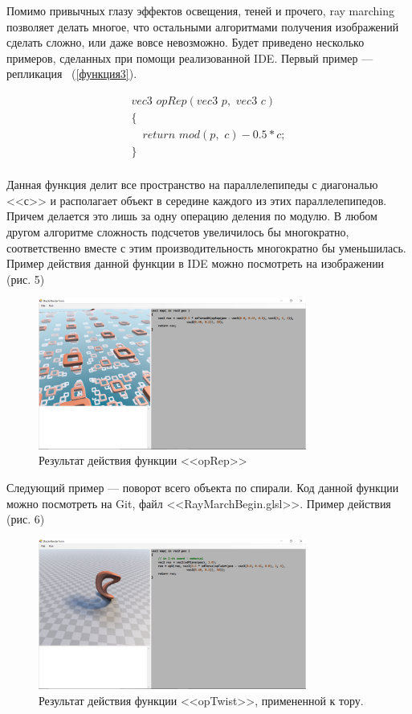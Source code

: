 \documentclass[14pt]{matmex-diploma}
\begin{document}
Помимо привычных глазу эффектов освещения, теней и прочего, ray marching позволяет делать многое, что остальными алгоритмами получения
изображений сделать сложно, или даже вовсе невозможно. Будет приведено несколько примеров, сделанных при помощи реализованной IDE.
Первый пример --- репликация ~(\ref{функция3}).

\begin{equation}
\label{функция3}
\begin{array}{ll}
vec3\,\,opRep(vec3\,\,p,\,\,vec3\,\,c)         \\
\{                                             \\
\,\,\,\,\,\,return\,\,mod(p,\,\,c) - 0.5 * c;  \\
\}                                             \\
\end{array}
\end{equation}

Данная функция делит все пространство на параллелепипеды с диагональю <<с>> и располагает объект в середине каждого 
из этих параллелепипедов. Причем делается это лишь за одну операцию деления по модулю. В любом другом алгоритме сложность подсчетов увеличилось
бы многократно, соответственно вместе с этим производительность многократно бы уменьшилась. Пример действия данной функции в IDE можно посмотреть на изображении (рис. 5)

\begin{figure}[h]
\label{replace}
\centering
\includegraphics[width = 250pt]{replace.png}
\caption{Результат действия функции <<opRep>>}
\end{figure}

Следующий пример --- поворот всего объекта по спирали. Код данной функции можно посмотреть на Git, файл <<RayMarchBegin.glsl>>. 
Пример действия (рис. 6)

\begin{figure}[h]
\label{twist}
\centering
\includegraphics[width = 250pt]{prim1.png}
\caption{Результат действия функции <<opTwist>>, примененной к тору.}
\end{figure}
\end{document}
